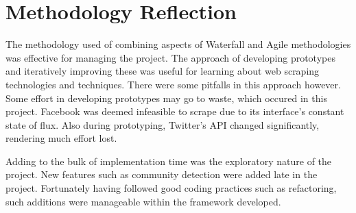 \section{Methodology Reflection}

The methodology used of combining aspects of Waterfall and Agile methodologies was effective for managing the project. The approach of developing prototypes and iteratively improving these was useful for learning about web scraping technologies and techniques. There were some pitfalls in this approach however. Some effort in developing prototypes may go to waste, which occured in this project. Facebook was deemed infeasible to scrape due to its interface's constant state of flux. Also during prototyping, Twitter's API changed significantly, rendering much effort lost. 

Adding to the bulk of implementation time was the exploratory nature of the project. New features such as community detection were added late in the project. Fortunately having followed good coding practices such as refactoring, such additions were manageable within the framework developed.  

 




